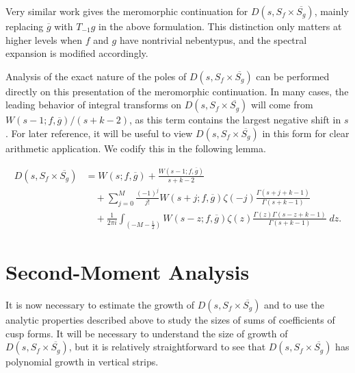 \begin{remark}
  Very similar work gives the meromorphic continuation for $D(s, S_f \times
  \overline{S_g})$, mainly replacing $\overline{g}$ with $T_{-1}g$ in the above
  formulation.
  This distinction only matters at higher levels when $f$ and $g$ have nontrivial
  nebentypus, and the spectral expansion is modified accordingly.
\end{remark}


Analysis of the exact nature of the poles of $D(s, S_f \times \overline{S_g})$ can be
performed directly on this presentation of the meromorphic continuation.
In many cases, the leading behavior of integral transforms on $D(s, S_f \times
\overline{S_g})$ will come from $W(s-1; f, \overline{g})/(s+k-2)$, as this term contains
the largest negative shift in $s$.
For later reference, it will be useful to view $D(s, S_f \times \overline{S_g})$ in this
form for clear arithmetic application.
We codify this in the following lemma.
\begin{lemma}\label{lem:D_is_lots_of_W}
  \begin{equation}
    \begin{split}
    D(s, S_f \times \overline{S_g}) &= W(s; f, \overline{g})
      + \frac{W(s-1; f, \overline{g})}{s+k-2} \\
    &\quad + \sum_{j = 0}^M \frac{(-1)^j}{j!} W(s+j; f, \overline{g}) \zeta(-j)
      \frac{\Gamma(s + j + k - 1)}{\Gamma(s + k - 1)} \\
    &\quad + \frac{1}{2\pi i} \int_{(-M - \frac{1}{2})} W(s-z; f, \overline{g})
      \zeta(z)\frac{\Gamma(z) \Gamma(s - z + k - 1)}{\Gamma(s + k - 1)} \; dz.
    \end{split}
  \end{equation}
\end{lemma}



\section{Second-Moment Analysis}\label{sec:secondmoment}


It is now necessary to estimate the growth of $D(s, S_f \times \overline{S_g})$ and to use
the analytic properties described above to study the sizes of sums of coefficients of cusp
forms.
It will be necessary to understand the size of growth of $D(s, S_f \times
\overline{S_g})$, but it is relatively straightforward to see that $D(s, S_f \times
\overline{S_g})$ has polynomial growth in vertical strips.


